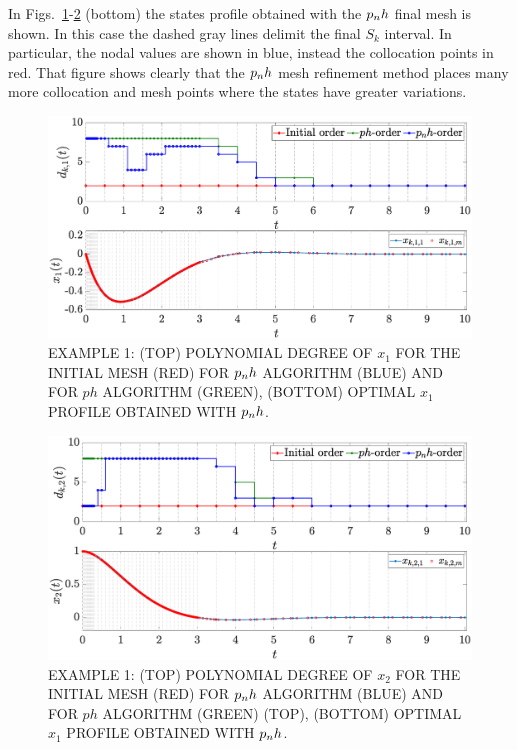 In Figs.~\ref{fig:pnh1vanderpol}-\ref{fig:pnh2vanderpol} (bottom) the states profile obtained with the $p_{n}h$ final mesh is shown. In this case the dashed gray lines delimit the final $S_k$ interval. In particular, the nodal values are shown in blue, instead the collocation points in red. That figure shows clearly that the $p_{n}h$ mesh refinement method places many more collocation and mesh points where the states have greater variations.
\begin{figure}[t]
	\centering
	\includegraphics[trim={1cm 0cm 2cm 0cm},clip,width=1\columnwidth]{Img/pnh1_vanderpol1}
	\caption{EXAMPLE 1:  (TOP) POLYNOMIAL DEGREE OF $x_{1}$ FOR THE INITIAL MESH (RED) FOR $p_{n}h$ ALGORITHM (BLUE) AND FOR $ph$ ALGORITHM (GREEN), (BOTTOM)
	OPTIMAL $x_1$ PROFILE OBTAINED WITH $p_{n}h$.}
	\label{fig:pnh1vanderpol}
\end{figure}
\begin{figure}[t]
	\centering
	\includegraphics[trim={1cm 0cm 2cm 0cm},clip,width=1\columnwidth]{Img/pnh2_vanderpol2}
	\caption{EXAMPLE 1: (TOP) POLYNOMIAL DEGREE OF $x_{2}$ FOR THE INITIAL MESH (RED) FOR $p_{n}h$ ALGORITHM (BLUE) AND FOR $ph$ ALGORITHM (GREEN) (TOP), (BOTTOM)
	OPTIMAL $x_1$ PROFILE OBTAINED WITH  $p_{n}h$.}
	\label{fig:pnh2vanderpol}
\end{figure}
